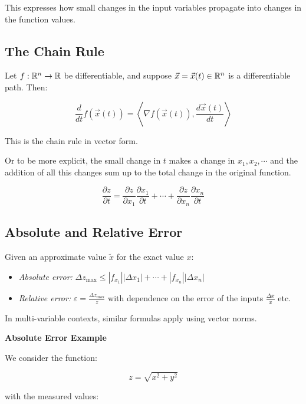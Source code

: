 This expresses how small changes in the input variables propagate into changes in the function values.

\subsection{The Chain Rule}

Let \( f : \mathbb{R}^n \to \mathbb{R} \) be differentiable, and suppose \( \vec{x} = \vec{x}(t) \in \mathbb{R}^n \) 
is a differentiable path. Then:

\[
    \frac{d}{dt} f(\vec{x}(t)) = \left\langle \nabla f(\vec{x}(t)), \frac{d\vec{x}(t)}{dt} \right\rangle
\]

This is the chain rule in vector form.

Or to be more explicit, the small change in \(t\) makes a change in \(x_1, x_2, \cdots\) and the addition 
of all this changes sum up to the total change in the original function.

\[
    \frac{\partial z}{\partial t} = \frac{\partial z}{\partial x_1}\frac{\partial x_1}{ \partial t} + 
    \cdots + \frac{\partial z}{\partial x_n}\frac{\partial x_n}{\partial t}
\]

\subsection{Absolute and Relative Error}

Given an approximate value \( \tilde{x} \) for the exact value \(x\):

\begin{itemize}

    \item \emph{Absolute error:} \(\Delta z_{\max} \le |f_{x_1}||\Delta x_1| + \cdots + |f_{x_n}|
          |\Delta x_n| \)

    \item \emph{Relative error:} \( \varepsilon = \frac{\Delta z_{\max}}{z}\) with dependence on the error 
          of the inputs \(\frac{\Delta x}{x}\) etc.

\end{itemize}

In multi-variable contexts, similar formulas apply using vector norms.

\textbf{Absolute Error Example}

We consider the function:

\[
    z = \sqrt{x^2 + y^2}
\]

with the measured values:

